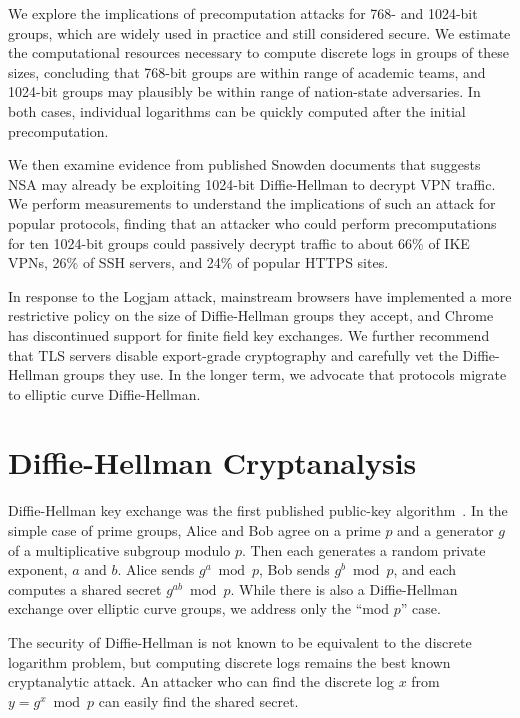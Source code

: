  We explore the implications
of precomputation attacks for 768- and 1024-bit groups, which are widely
used in practice and still considered secure.  We estimate the computational resources necessary to compute
discrete logs in groups of these sizes, concluding that 768-bit
groups are within range of academic teams, and 1024-bit groups
may plausibly be within range of nation-state adversaries.  In both cases,
individual logarithms can be quickly computed after the initial precomputation.

We then examine evidence
from published Snowden documents that suggests NSA may already
be exploiting 1024-bit Diffie-Hellman to decrypt VPN
traffic.  We perform measurements to understand the implications
of such an attack for popular protocols, finding that an attacker
who could perform precomputations for ten 1024-bit groups could
passively decrypt traffic to about 66\% of IKE VPNs,
26\% of SSH servers, and 24\% of popular HTTPS sites.

 In response to the Logjam attack, mainstream
browsers have implemented a more restrictive policy on the size of
Diffie-Hellman groups they accept, and Chrome has discontinued support for finite field key exchanges. We further recommend that TLS servers
disable export-grade cryptography and
carefully vet the Diffie-Hellman
groups they use. In the longer term, we advocate that protocols
migrate to elliptic curve Diffie-Hellman.

\section{Diffie-Hellman Cryptanalysis}
\label{sec:dl}

Diffie-Hellman key exchange was the first published public-key
algorithm~\cite{diffie1976new}.  In the simple case of prime groups,
Alice and Bob agree on a prime $p$ and a generator $g$ of a
multiplicative subgroup modulo $p$.  Then each generates
a random private exponent, $a$ and $b$. Alice sends $g^a \bmod p$, Bob
sends $g^b \bmod p$, and each computes a shared secret $g^{ab} \bmod
p$. While there is also a Diffie-Hellman exchange over elliptic curve
groups, we address only the ``mod $p$'' case.

The security of Diffie-Hellman is not known to be equivalent to
the discrete logarithm problem, but
computing discrete logs remains the best known cryptanalytic
attack. An attacker who can find the discrete log $x$ from $y = g^x \bmod p$ can
easily find the shared secret.

